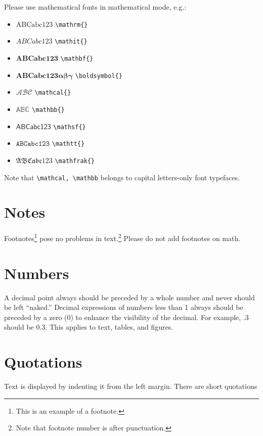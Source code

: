 \documentclass[qe,nameyear,draft]{econsocart}
\theoremstyle{plain}
\begin{document}
Please use mathematical fonts in mathematical mode, e.g.:

\begin{itemize}
\item $\mathrm{ABCabc123}$ \texttt{{\textbackslash}mathrm\{\}}
\item $\mathit{ABCabc123}$ \texttt{{\textbackslash}mathit\{\}}
\item $\mathbf{ABCabc123}$ \texttt{{\textbackslash}mathbf\{\}}
\item $\boldsymbol{ABCabc123\alpha\beta\gamma}$ \texttt{{\textbackslash}boldsymbol\{\}}
\item $\mathcal{ABC}$ \texttt{{\textbackslash}mathcal\{\}}
\item $\mathbb{ABC}$ \texttt{{\textbackslash}mathbb\{\}}
\item $\mathsf{ABCabc123}$ \texttt{{\textbackslash}mathsf\{\}}
\item $\mathtt{ABCabc123}$ \texttt{{\textbackslash}mathtt\{\}}
\item $\mathfrak{ABCabc123}$ \texttt{{\textbackslash}mathfrak\{\}}
\end{itemize}

Note that \texttt{{\textbackslash}mathcal, {\textbackslash}mathbb} belongs to capital letters-only font typefaces.

\section{Notes}

Footnotes\footnote{This is an example of a footnote.}
pose no problems in text.\footnote{Note that footnote number is after punctuation.} Please do not add footnotes on math.

\section{Numbers}

A decimal point always should be preceded by a whole number and never should be left ``naked.'' Decimal expressions of numbers less than 1 always should be preceded by a zero (0) to enhance the visibility of the decimal. For example, .3 should be 0.3. This applies to text, tables, and figures.

\section{Quotations}

Text is displayed by indenting it from the left margin. There are short quotations
\end{document}
